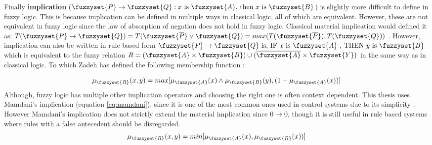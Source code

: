 Finally \textbf{implication}  ($\fuzzyset{P}\to \fuzzyset{Q}: x \text{ is } \fuzzyset{A} \text{, then }x \text{ is } \fuzzyset{B}$) is slightly more difficult to define in fuzzy logic. This is because implication can be defined in multiple ways in classical logic, all of which are equivalent. However, these are not equivalent in fuzzy logic since the law of absorption of negation does not hold in fuzzy logic. Classical material implication would  defined it as: $T(\fuzzyset{P}\to \fuzzyset{Q})=T(\fuzzyset{\overline{P}}\lor\fuzzyset{Q})=max(T(\fuzzyset{\overline{P}}),T(\fuzzyset{Q}))$ \cite{oh1987properties}.
However, implication can also be written in rule based form  $\fuzzyset{P} \to \fuzzyset{Q} \text{ is,  IF } x \text{ is } \fuzzyset{A} \text{ , THEN } y \text{ is } \fuzzyset{B}$ which is equivalent to the fuzzy relation $R=(\fuzzyset{A}\times\fuzzyset{B})\cup (\overline{\fuzzyset{A}}\times \fuzzyset{Y})$ in the same way as in classical logic.
To which Zadeh has defined the following membership function \cite{oh1987properties}:

\begin{equation}
    \mu_{\fuzzyset{R}}(x,y)=max[\mu_{\fuzzyset{A}}(x)\land\mu_{\fuzzyset{B}}(y),(1-\mu_{\fuzzyset{A}}(x))]
    \label{eq:implication-orig}
\end{equation}
Although, fuzzy logic has multiple other implication operators and choosing the right one is often context dependent. This thesis uses Mamdani's implication (equation \ref{eq:mamdani}), since it is one of the most common ones used in control systems  due to its simplicity \cite{ross2009fuzzy}. However Mamdani's implication does not strictly extend the material implication since $0 \to 0$, though it is still useful in rule based systems where rules with a false antecedent should be disregarded.
\begin{equation}
    \mu_{\fuzzyset{R}}(x,y)=min[\mu_{\fuzzyset{A}}(x),\mu_{\fuzzyset{B}}(x))]
    \label{eq:mamdani}
\end{equation}


